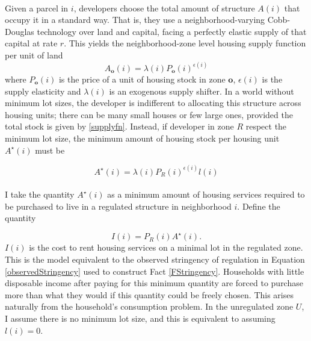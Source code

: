 \documentclass[11pt]{article}
\begin{document}
	\paragraph*{}
	Given a parcel in $i$, developers choose the total amount of structure $A(i)$ that occupy it in a standard way. That is, they use a neighborhood-varying Cobb-Douglas technology over land and capital, facing a perfectly elastic supply of that capital at rate $r$. This yields the neighborhood-zone level housing supply function per unit of land
	\begin{equation}\label{supplyfn}
		A_{\boldsymbol{o}}(i) = \lambda(i)P_{\boldsymbol{o}}(i)^{\epsilon(i)}
	\end{equation}
	where $P_{\boldsymbol{o}}(i)$ is the price of a unit of housing stock in zone $\boldsymbol{o}$, $\epsilon(i)$ is the supply elasticity and $\lambda(i)$ is an exogenous supply shifter. In a world without minimum lot sizes, the developer is indifferent to allocating this structure across housing units; there can be many small houses or few large ones, provided the total stock is given by \eqref{supplyfn}. Instead, if developer in zone $R$ respect the minimum lot size, the minimum amount of housing stock per housing unit $A^{\star}(i)$ must be

	\begin{equation}\label{minstructure}
		A^{\star}(i) = \lambda(i)P_{R}(i)^{\epsilon(i)}l(i)
	\end{equation}

	\paragraph*{}
	I take the quantity $A^{\star}(i)$ as a minimum amount of housing services required to be purchased to live in a regulated structure in neighborhood $i$. Define the quantity 
	
	\begin{equation}\label{stringency}
		I(i) = P_{R}(i)A^{\star}(i).
	\end{equation}
	$I(i)$ is the cost to rent housing services on a minimal lot in the regulated zone. This is the model equivalent to the observed stringency of regulation in Equation \eqref{observedStringency} used to construct Fact \ref{FStringency}. Households with little disposable income after paying for this minimum quantity are forced to purchase more than what they would if this quantity could be freely chosen. This arises naturally from the household's consumption problem. In the unregulated zone $U$, I assume there is no minimum lot size, and this is equivalent to assuming $l(i) = 0$. 
	
\end{document}
